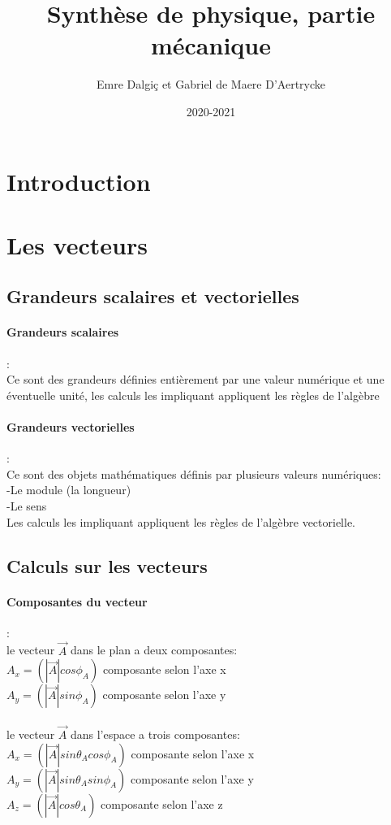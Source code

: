 \documentclass[a4paper,11pt]{article}
\begin{document}
\title{Synthèse de physique, partie mécanique}
\date{2020-2021}
\author{Emre Dalgiç et Gabriel de Maere D'Aertrycke}

\maketitle

\section{Introduction}
\section{Les vecteurs}
	\subsection{Grandeurs scalaires et vectorielles}
		\paragraph{Grandeurs scalaires} : \\Ce sont des grandeurs définies 					entièrement par une valeur numérique et une éventuelle unité, les calculs 		les impliquant appliquent les règles de l'algèbre
			
		\paragraph{Grandeurs vectorielles} :\\ Ce sont des objets mathématiques 			définis par plusieurs valeurs numériques:\\
		-Le module (la longueur)\\
		-Le sens\\
		Les calculs les impliquant appliquent les règles de l'algèbre 						vectorielle.
		
	\subsection{Calculs sur les vecteurs}
	\paragraph{Composantes du vecteur}:\\
	le vecteur $\vec{A}$ dans le plan a deux composantes:
	\\ $A_x = (|\vec{A}|cos\phi_A)$ composante selon l'axe x
	\\ $A_y = (|\vec{A}|sin\phi_A)$ composante selon l'axe y
	\\
	\\le vecteur $\vec{A}$ dans l'espace a trois composantes:
	\\ $A_x = (|\vec{A}|sin\theta_Acos\phi_A)$ composante selon l'axe x
	\\ $A_y = (|\vec{A}|sin\theta_Asin\phi_A)$ composante selon l'axe y
	\\ $A_z = (|\vec{A}|cos\theta_A)$ composante selon l'axe z
	
\end{document}
